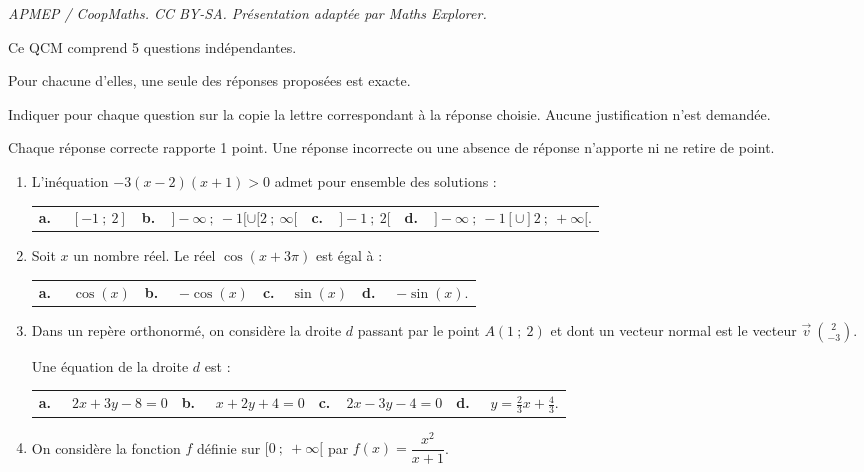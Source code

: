 \documentclass[10pt]{article}
\providecommand{\vv}[1]{\overrightarrow{#1}}
\providecommand{\vv}[1]{{\overrightarrow{#1}}}
\begin{document}
\noindent\textit{APMEP / CoopMaths. CC BY-SA. Présentation adaptée par Maths Explorer.}\par\medskip
\medskip

Ce QCM comprend 5 questions indépendantes. 

Pour chacune d'elles, une seule des réponses proposées est exacte.

Indiquer pour chaque question sur la copie la lettre correspondant à la réponse choisie. Aucune justification n'est demandée.

Chaque réponse correcte rapporte 1 point. Une réponse incorrecte ou une absence de réponse n'apporte ni ne retire de point.

\medskip

\begin{enumerate}
\item  L'inéquation $-3(x-2)(x+1)>0$ admet pour ensemble des solutions :

\medskip

\begin{tabularx}{1.05\linewidth}{*{4}{X}}
\textbf{a.~~} $[-1~;~2] $ &\textbf{b.~~}\small $]-\infty~;~-1[\cup[2~;~\infty[ $&\textbf{c.~~}$]-1~;~2[ $& \textbf{d.~~}\small $ ]-\infty~;~-1[\cup]2~;~+\infty[ $.
\end{tabularx}

\item Soit $x$ un nombre réel. Le réel $\cos(x+3\pi)$ est égal à :

\medskip

\begin{tabularx}{1.05\linewidth}{*{4}{X}}
\textbf{a.~~} $\cos(x) $ &\textbf{b.~~} $-\cos(x) $&\textbf{c.~~}$\sin(x) $& \textbf{d.~~} $-\sin (x)  $.
\end{tabularx}

\item  Dans un repère orthonormé, on considère la droite $d$ passant par le point $A(1~;~2)$ et dont un vecteur normal est le vecteur $\vv{v}\ \binom{2}{-3}$. 

Une équation de la droite $d$ est :

\medskip

\begin{tabularx}{1.05\linewidth}{*{4}{X}}
\textbf{a.~~} $2x+3y-8=0 $ &\textbf{b.~~} $ x+2y+4=0 $&\textbf{c.~~}$ 2x-3y-4=0$& \textbf{d.~~} $y=\frac{2}{3}x+\frac{4}{3}  $.
\end{tabularx}

\item On considère la fonction $f$ définie sur $[0~;~+\infty[$ par $f(x)=\dfrac{x^2}{x+1}$.


\end{enumerate}
\end{document}
